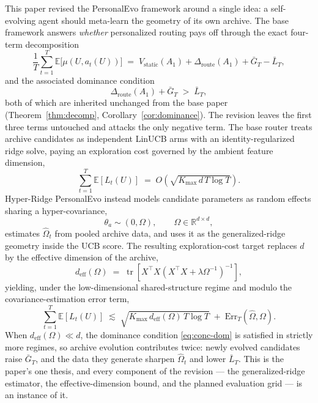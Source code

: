 \documentclass{article} %
\providecommand{\E}{\mathbb{E}}
\begin{document}
This paper revised the PersonalEvo framework around a single idea: a self-evolving agent should meta-learn the geometry of its own archive. The base framework answers \emph{whether} personalized routing pays off through the exact four-term decomposition
\begin{equation}
\label{eq:conc-decomp}
\frac{1}{T}\sum_{t=1}^{T}\E\bigl[\mu(U,a_t(U))\bigr]
\;=\;
V_{\mathrm{static}}(A_1)
+ \Delta_{\mathrm{route}}(A_1)
+ \bar G_T
- \bar L_T,
\end{equation}
and the associated dominance condition
\begin{equation}
\label{eq:conc-dom}
\Delta_{\mathrm{route}}(A_1) + \bar G_T \;>\; \bar L_T,
\end{equation}
both of which are inherited unchanged from the base paper (Theorem~\ref{thm:decomp}, Corollary~\ref{cor:dominance}). The revision leaves the first three terms untouched and attacks the only negative term. The base router treats archive candidates as independent LinUCB arms with an identity-regularized ridge solve, paying an exploration cost governed by the ambient feature dimension,
\begin{equation}
\label{eq:conc-base-rate}
\sum_{t=1}^{T}\E[L_t(U)]
\;=\;
O\!\left(\sqrt{K_{\max}\, d\, T \log T}\right).
\end{equation}
Hyper-Ridge PersonalEvo instead models candidate parameters as random effects sharing a hyper-covariance,
\begin{equation}
\label{eq:conc-random-effects}
\theta_a \sim (0,\Omega), \qquad \Omega \in \mathbb{R}^{d\times d},
\end{equation}
estimates $\widehat\Omega_t$ from pooled archive data, and uses it as the generalized-ridge geometry inside the UCB score. The resulting exploration-cost target replaces $d$ by the effective dimension of the archive,
\begin{equation}
\label{eq:conc-deff}
d_{\mathrm{eff}}(\Omega)
\;=\;
\operatorname{tr}\!\left[
X^\top X \left(X^\top X + \lambda \Omega^{-1}\right)^{-1}
\right],
\end{equation}
yielding, under the low-dimensional shared-structure regime and modulo the covariance-estimation error term,
\begin{equation}
\label{eq:conc-hyper-rate}
\sum_{t=1}^{T}\E[L_t(U)]
\;\lesssim\;
\sqrt{K_{\max}\, d_{\mathrm{eff}}(\Omega)\, T \log T}
\;+\;
\mathrm{Err}_T(\widehat\Omega, \Omega).
\end{equation}
When $d_{\mathrm{eff}}(\Omega) \ll d$, the dominance condition \eqref{eq:conc-dom} is satisfied in strictly more regimes, so archive evolution contributes twice: newly evolved candidates raise $\bar G_T$, and the data they generate sharpen $\widehat\Omega_t$ and lower $\bar L_T$. This is the paper's one thesis, and every component of the revision --- the generalized-ridge estimator, the effective-dimension bound, and the planned evaluation grid --- is an instance of it.
\end{document}
